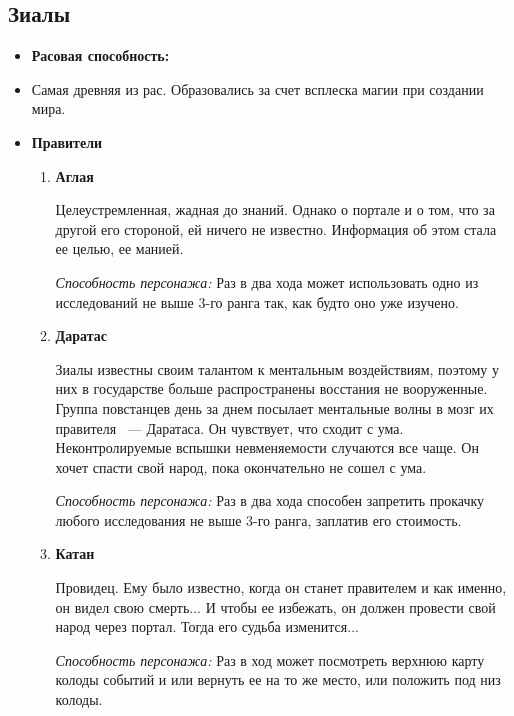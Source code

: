 \documentclass[a4paper,12pt,landscape]{article}
\begin{document}
    \subsection{Зиалы}
    \begin {itemize}
      \item \textbf{Расовая способность:} 
      \item Самая древняя из рас. Образовались за счет всплеска магии при создании мира.
      \item \textbf{Правители}
        \begin{enumerate}
          \item \textbf{Аглая}
          
          Целеустремленная, жадная до знаний. Однако о портале и о том, что за другой его стороной, ей ничего не известно. Информация об этом стала ее целью, ее манией.
          
          \textit{Способность персонажа:} Раз в два хода может использовать одно из исследований не выше 3-го ранга так, как будто оно уже изучено.
          
          \item \textbf{Даратас}
          
          Зиалы известны своим талантом к ментальным воздействиям, поэтому у них в государстве больше распространены восстания не вооруженные. Группа повстанцев день за днем посылает ментальные волны в мозг их правителя ~--- Даратаса. Он чувствует, что сходит с ума. Неконтролируемые вспышки невменяемости случаются все чаще. Он хочет спасти свой народ, пока окончательно не сошел с ума.
          
          \textit{Способность персонажа:} Раз в два хода способен запретить прокачку любого исследования не выше 3-го ранга, заплатив его стоимость.
          
          \item \textbf{Катан}
          
          Провидец. Ему было известно, когда он станет правителем и как именно, он видел свою смерть... И чтобы ее избежать, он должен провести свой народ через портал. Тогда его судьба изменится...
          
          \textit{Способность персонажа:} Раз в ход может посмотреть верхнюю карту колоды событий и или вернуть ее на то же место, или положить под низ колоды.
          
        \end{enumerate}
        
    \end{itemize}
\end{document}
